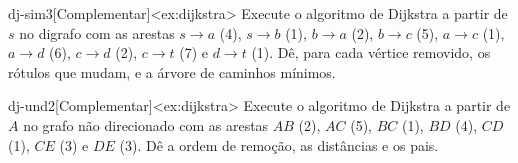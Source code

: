 \begin{exercicio}{dj-sim3}[Complementar]<ex:dijkstra>
Execute o algoritmo de Dijkstra a partir de $s$ no digrafo com as arestas $s\to a$ (4), $s\to b$ (1), $b\to a$ (2), $b\to c$ (5), $a\to c$ (1), $a\to d$ (6), $c\to d$ (2), $c\to t$ (7) e $d\to t$ (1). Dê, para cada vértice removido, os rótulos que mudam, e a árvore de caminhos mínimos.
\end{exercicio}
\begin{exercicio}{dj-und2}[Complementar]<ex:dijkstra>
Execute o algoritmo de Dijkstra a partir de $A$ no grafo não direcionado com as arestas $AB$ (2), $AC$ (5), $BC$ (1), $BD$ (4), $CD$ (1), $CE$ (3) e $DE$ (3). Dê a ordem de remoção, as distâncias e os pais.
\end{exercicio}
